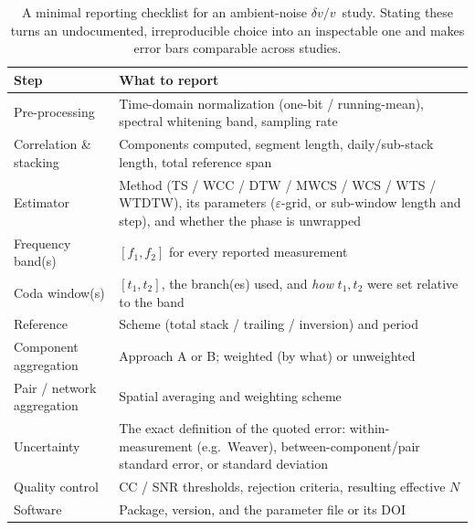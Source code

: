 \documentclass[
  referee]{gji}
\providecommand{\dvv}{\ensuremath{\delta v/v}}
\begin{document}
\begin{table}
\footnotesize
\caption{A minimal reporting checklist for an ambient-noise \dvv\ study. Stating
these turns an undocumented, irreproducible choice into an inspectable one and
makes error bars comparable across studies.}
\label{tab:checklist}
\begin{tabularx}{\textwidth}{@{}>{\raggedright\arraybackslash}p{3.4cm} L@{}}
\toprule
\textbf{Step} & \textbf{What to report} \\
\midrule
Pre-processing & Time-domain normalization (one-bit / running-mean), spectral
whitening band, sampling rate \\ \hline
Correlation \& stacking & Components computed, segment length, daily/sub-stack
length, total reference span \\ \hline
Estimator & Method (TS / WCC / DTW / MWCS / WCS / WTS / WTDTW), its parameters
($\varepsilon$-grid, or sub-window length and step), and whether the phase is
unwrapped \\ \hline
Frequency band(s) & $[f_1,f_2]$ for every reported measurement \\ \hline
Coda window(s) & $[t_1,t_2]$, the branch(es) used, and \emph{how} $t_1,t_2$ were
set relative to the band \\ \hline
Reference & Scheme (total stack / trailing / inversion) and period \\ \hline
Component aggregation & Approach A or B; weighted (by what) or unweighted \\ \hline
Pair / network aggregation & Spatial averaging and weighting scheme \\ \hline
Uncertainty & The exact definition of the quoted error: within-measurement
(e.g.\ Weaver), between-component/pair standard error, or standard deviation \\ \hline
Quality control & CC / SNR thresholds, rejection criteria, resulting effective
$N$ \\ \hline
Software & Package, version, and the parameter file or its DOI \\
\bottomrule
\end{tabularx}
\end{table}
\end{document}
